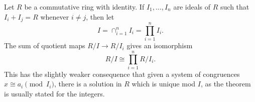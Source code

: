 \documentclass{article}
\begin{document}
Let $R$ be a commutative ring with identity.  If $I_1,\ldots,I_n$ are ideals of $R$ such that $I_i + I_j = R$ whenever $i\neq j$, then let $$I=\cap_{i=1}^n I_i = \prod_{i=1}^n I_i.$$ The sum of quotient maps $R/I\to R/I_i$ gives an isomorphism
$$R/I\cong \prod_{i=1}^n {R}/{I_i}.$$  This has the slightly weaker consequence that given a system of congruences $x\cong a_i\pmod{I_i}$, there is a solution in $R$ which is unique mod $I$, as the theorem is usually stated for the integers.
\end{document}
